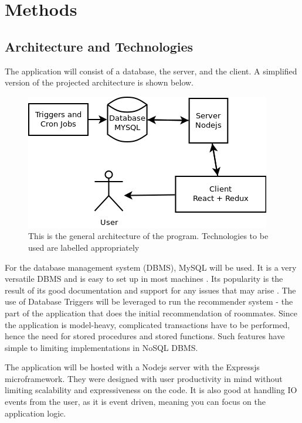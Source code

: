 \documentclass[journal]{IEEEtran}
\begin{document}
\section{Methods}

\subsection{Architecture and Technologies}
The application will consist of a database, the server, and the client. A simplified version of the projected
architecture is shown below.

\begin{figure}[h]
\centering
\includegraphics[scale=0.5]{Architecture}
\caption{This is the general architecture of the program. Technologies to be used are labelled appropriately}
\end{figure}

For the database management system (DBMS), MySQL will be used. It is a very versatile DBMS and is easy to set up in most
machines \cite{mysqlpage}. Its popularity is the result of its good documentation and support for any issues that may
arise \cite{mysqlpage}. The use of Database Triggers will be leveraged to run the recommender system - the part of the
application that does the initial recommendation of roommates. Since the application is model-heavy, complicated
transactions have to be performed, hence the need for stored procedures and stored functions. Such features have simple
to limiting implementations in NoSQL DBMS.

The application will be hosted with a Nodejs server with the Expressjs microframework. They were designed with user
productivity in mind without limiting scalability and expressiveness on the code. It is also good at handling IO events
from the user, as it is event driven, meaning you can focus on the application logic.
\end{document}
